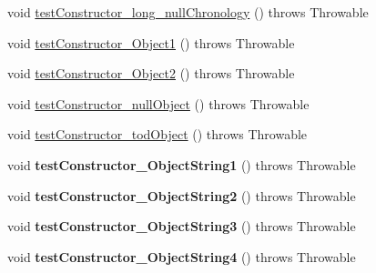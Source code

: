 \begin{DoxyCompactItemize}
\item 
void \hyperlink{classorg_1_1joda_1_1time_1_1_test_time_of_day___constructors_a6aace65c1187d159b068b207365755a2}{test\-Constructor\-\_\-long\-\_\-null\-Chronology} ()  throws Throwable 
\item 
void \hyperlink{classorg_1_1joda_1_1time_1_1_test_time_of_day___constructors_a6132a31c3f8f96e6a3d9912801af4624}{test\-Constructor\-\_\-\-Object1} ()  throws Throwable 
\item 
void \hyperlink{classorg_1_1joda_1_1time_1_1_test_time_of_day___constructors_a52555d994bdb3d2d60ba624f48b594c3}{test\-Constructor\-\_\-\-Object2} ()  throws Throwable 
\item 
void \hyperlink{classorg_1_1joda_1_1time_1_1_test_time_of_day___constructors_a0632945f18e4c6f7b8ea91ba8e53c86f}{test\-Constructor\-\_\-null\-Object} ()  throws Throwable 
\item 
void \hyperlink{classorg_1_1joda_1_1time_1_1_test_time_of_day___constructors_a5b1f3ae7e2c1c45991c8279e687d149c}{test\-Constructor\-\_\-tod\-Object} ()  throws Throwable 
\item 
\hypertarget{classorg_1_1joda_1_1time_1_1_test_time_of_day___constructors_a0f2c3dcb391ac3930fcd0e5bbda409fe}{void {\bfseries test\-Constructor\-\_\-\-Object\-String1} ()  throws Throwable }\label{classorg_1_1joda_1_1time_1_1_test_time_of_day___constructors_a0f2c3dcb391ac3930fcd0e5bbda409fe}

\item 
\hypertarget{classorg_1_1joda_1_1time_1_1_test_time_of_day___constructors_a88c46641ac06234fca0dc153ca116a64}{void {\bfseries test\-Constructor\-\_\-\-Object\-String2} ()  throws Throwable }\label{classorg_1_1joda_1_1time_1_1_test_time_of_day___constructors_a88c46641ac06234fca0dc153ca116a64}

\item 
\hypertarget{classorg_1_1joda_1_1time_1_1_test_time_of_day___constructors_a00e300be707a3001910e29f73bdf5a7c}{void {\bfseries test\-Constructor\-\_\-\-Object\-String3} ()  throws Throwable }\label{classorg_1_1joda_1_1time_1_1_test_time_of_day___constructors_a00e300be707a3001910e29f73bdf5a7c}

\item 
\hypertarget{classorg_1_1joda_1_1time_1_1_test_time_of_day___constructors_a9e2bdacd8987377be0d30cde99057cd7}{void {\bfseries test\-Constructor\-\_\-\-Object\-String4} ()  throws Throwable }\label{classorg_1_1joda_1_1time_1_1_test_time_of_day___constructors_a9e2bdacd8987377be0d30cde99057cd7}


\end{DoxyCompactItemize}
